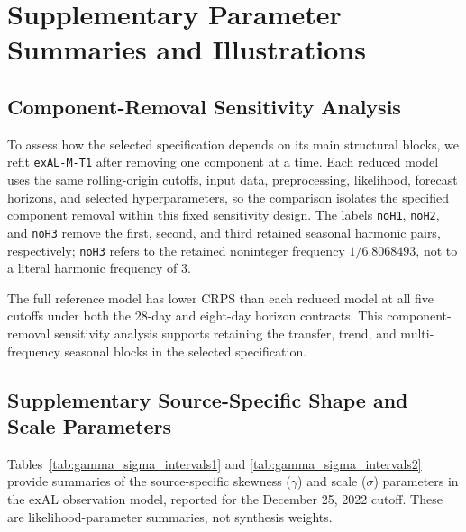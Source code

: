 \documentclass[APA,STIX1COL]{WileyNJD-v2}
\begin{document}
\clearpage


\appendix

\section{Supplementary Parameter Summaries and Illustrations}
\label{app:extras}

\subsection{Component-Removal Sensitivity Analysis}
\label{app:he3ablation}

To assess how the selected specification depends on its main structural blocks, we refit \texttt{exAL-M-T1} after removing one component at a time. Each reduced model uses the same rolling-origin cutoffs, input data, preprocessing, likelihood, forecast horizons, and selected hyperparameters, so the comparison isolates the specified component removal within this fixed sensitivity design. The labels \texttt{noH1}, \texttt{noH2}, and \texttt{noH3} remove the first, second, and third retained seasonal harmonic pairs, respectively; \texttt{noH3} refers to the retained noninteger frequency \(1/6.8068493\), not to a literal harmonic frequency of 3.





The full reference model has lower CRPS than each reduced model at all five cutoffs under both the 28-day and eight-day horizon contracts. This component-removal sensitivity analysis supports retaining the transfer, trend, and multi-frequency seasonal blocks in the selected specification.

\subsection{Supplementary Source-Specific Shape and Scale Parameters}
\label{app:sourceparams}





Tables~\ref{tab:gamma_sigma_intervals1} and \ref{tab:gamma_sigma_intervals2} provide summaries of the source-specific skewness (\(\gamma\)) and scale (\(\sigma\)) parameters in the exAL observation model, reported for the December 25, 2022 cutoff. These are likelihood-parameter summaries, not synthesis weights.
\end{document}
